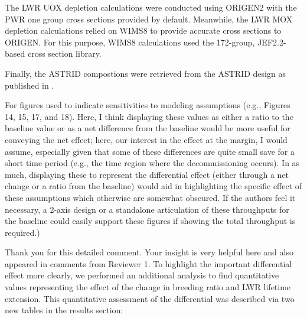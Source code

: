 \documentclass[answers,11pt]{exam}
\begin{document}
\begin{questions}
\begin{solution}
                The \gls{LWR} \gls{UOX} depletion calculations were conducted 
                using ORIGEN2 with the \gls{PWR} one group cross sections 
                provided by default. Meanwhile, the \gls{LWR} \gls{MOX} 
                depletion calculations relied on WIMS8 \cite{wims8_wims_1999} 
                to provide accurate cross sections to ORIGEN. For this purpose, 
                WIMS8 calculations used the 172-group, JEF2.2-based cross 
                section library.

                Finally, the \gls{ASTRID} compostions were retrieved from the 
                \gls{ASTRID} design as published in 
                \cite{varaine_pre-conceptual_2012}.



        \end{solution}

        \question For figures used to indicate sensitivities to modeling 
        assumptions (e.g., Figures 14, 15, 17, and 18). Here, I think 
        displaying these values as either a ratio to the baseline value or as a 
        net difference from the baseline would be more useful for conveying the 
        net effect; here, our interest in the effect at the margin, I would 
        assume, especially given that some of these differences are quite small 
        save for a short time period (e.g., the time region where the 
        decommissioning occurs). In as much, displaying these to represent the 
        differential effect (either through a net change or a ratio from the 
        baseline) would aid in highlighting the specific effect of these 
        assumptions which otherwise are somewhat obscured. If the authors feel 
        it necessary, a 2-axis design or a standalone articulation of these 
        throughputs for the baseline could easily support these figures if 
        showing the total throughput is required.)

        \begin{solution}
                Thank you for this detailed comment. Your insight is very 
                helpful here and also appeared in comments from Reviewer 1. To 
                highlight the important differential effect
                 more clearly, 
                we performed an additional
        	analysis to find quantitative values representing the effect
        	of the change in breeding ratio and LWR lifetime extension.
                This quantitative assessment of the differential was described 
                via two new tables in the results section:



\end{solution}
\end{questions}
\end{document}
